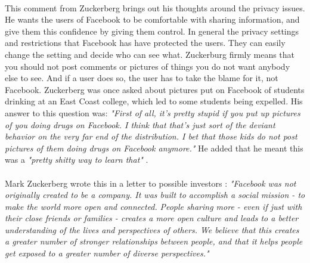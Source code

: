 \paragraph{}
This comment from Zuckerberg brings out his thoughts around the privacy issues. He wants the users of Facebook to be comfortable with sharing information, and give them this confidence by giving them control. In general the privacy settings and restrictions that Facebook has have protected the users. They can easily change the setting and decide who can see what. Zuckerburg firmly means that you should not post comments or pictures of things you do not want anybody else to see. And if a user does so, the user has to take the blame for it, not Facebook. Zuckerberg was once asked about pictures put on Facebook of students drinking at an East Coast college, which led to some students being expelled. His answer to this question was: \textit{"First of all, it's pretty stupid if you put up pictures of you doing drugs on Facebook. I think that that's just sort of the deviant behavior on the very far end of the distribution. I bet that those kids do not post pictures of them doing drugs on Facebook anymore."} He added that he meant this was a \textit{"pretty shitty way to learn that"} \cite{MeMedia}.

\paragraph{}
Mark Zuckerberg wrote this in a letter to possible investors \cite{LetterToInvestors}: \textit{"Facebook was not originally created to be a company. It was built to accomplish a social mission - to make the world more open and connected.} \textit{People sharing more - even if just with their close friends or families - creates a more open culture and leads to a better understanding of the lives and perspectives of others. We believe that this creates a greater number of stronger relationships between people, and that it helps people get exposed to a greater number of diverse perspectives."}
